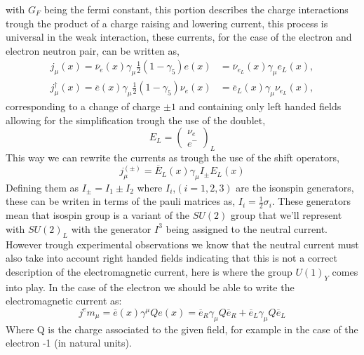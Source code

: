 \documentclass[11pt,twoside,a4paper]{article}
\begin{document}
 with $G_F$ being the fermi constant, this portion describes the charge interactions trough the product of a charge raising and lowering current, this process is universal in the weak interaction, these currents, for the case of the electron and electron neutron pair, can be written as,   
\begin{align}
j_\mu(x)=\overline{\nu}_e(x) \gamma_\mu \frac{1}{2}(1-\gamma_5)e(x) & = \overline{\nu}_{e_L}(x) \gamma_\mu e_L(x), \\
j_\mu^\dagger (x)=\overline{e}(x) \gamma_\mu \frac{1}{2}(1-\gamma_5) \nu_e (x) & = \overline{e}_L(x) \gamma_\mu \nu_{e_L} (x),
\end{align}
corresponding to a change of charge $\pm 1$ and containing only left handed fields allowing for the simplification trough the use of the doublet, 
\begin{equation}
E_L = \left( \begin{matrix}
\nu_e \\ 
e^- 
\end{matrix} \right)_L
\end{equation}
This way we can rewrite the currents as trough the use of the shift operators, 
\begin{equation}
j_\mu^{(\pm)} =  \overline{E}_L (x) \gamma_\mu I_\pm E_L(x) 
\end{equation}
Defining them as $I_\pm=I_1 \pm I_2$ where $I_i$,$(i=1,2,3) $ are the isonspin generators, these can be writen in terms of the pauli matrices as, $I_i=\frac{1}{2} \sigma_i$. These generators mean that isospin group is a variant of the $SU(2)$ group that we'll represent with $SU(2)_L$ with the generator $I^3$ being assigned to the neutral current. However trough experimental observations we know that the neutral current must also take into account right handed fields indicating that this is not a correct description of the electromagnetic current, here is where the group $U(1)_Y$ comes into play. In the case of the electron we should be able to write the electromagnetic current as: 
\begin{equation}
j^em_\mu = \overline{e}(x) \gamma^\mu Q e (x)= \overline{e}_R \gamma_\mu Q \overline{e}_R +   \overline{e}_L \gamma_\mu Q \overline{e}_L
\end{equation}
Where Q is the charge associated to the given field, for example in the case of the electron -1 (in natural units). 
\end{document}
